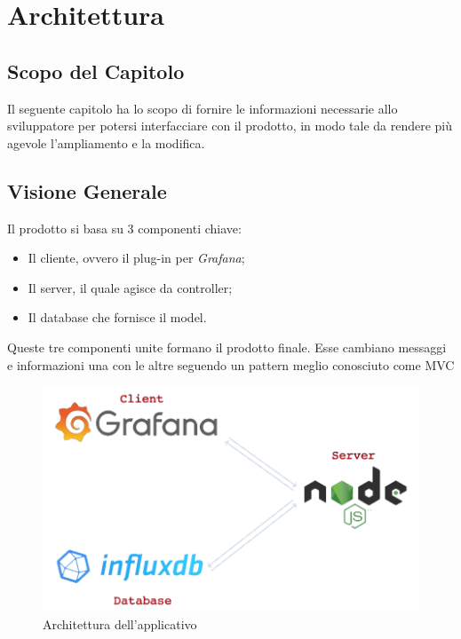 \section{Architettura}\label{architettura}
\subsection{Scopo del Capitolo}
Il seguente capitolo ha lo scopo di fornire le informazioni necessarie allo sviluppatore per potersi interfacciare con il prodotto, in modo tale da rendere più agevole l'ampliamento e la modifica.

\subsection{Visione Generale}\label{archGenerale}
Il prodotto si basa su 3 componenti chiave: 
\begin{itemize}
	\item Il cliente, ovvero il plug-in per \textit{Grafana}; 
	\item Il server, il quale agisce da controller; 
	\item Il database che fornisce il model.
\end{itemize}
Queste tre componenti unite formano il prodotto finale. Esse cambiano messaggi e informazioni una con le altre seguendo un pattern meglio conosciuto come MVC\glossario 

\begin{figure}[H]
	\begin{center}
		\includegraphics[scale=0.5]{./images/architettura.png} 
	\end{center}
	\caption{Architettura dell'applicativo}
\end{figure}


